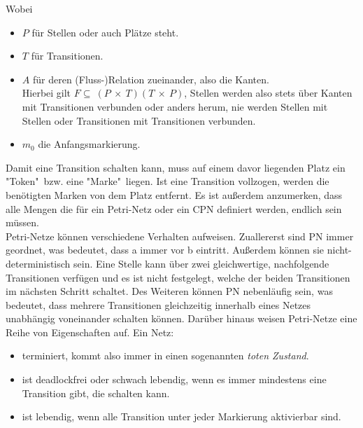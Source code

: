 \documentclass[11pt,onecolumn,a4paper,DIV=calc]{scrartcl}
\begin{document}
Wobei \begin{itemize}
\item $P$ für Stellen oder auch Plätze steht.
\item $T$ für Transitionen.
\item $A$ für deren (Fluss-)Relation zueinander, also die Kanten. \\
Hierbei gilt $F \subseteq\ (P\ \times\ T)(T\ \times\ P)$, Stellen werden also stets über Kanten mit Transitionen verbunden oder anders herum, nie werden Stellen mit Stellen oder Transitionen mit Transitionen verbunden.
\item $m_0$ die Anfangsmarkierung.
\end{itemize}
Damit eine Transition schalten kann, muss auf einem davor liegenden Platz ein "Token"\ bzw. eine "Marke"\ liegen. Ist eine Transition vollzogen, werden die benötigten Marken von dem Platz entfernt. Es ist außerdem anzumerken, dass alle Mengen die für ein Petri-Netz oder ein CPN definiert werden, endlich sein müssen.\\
Petri-Netze können verschiedene Verhalten aufweisen. Zuallererst sind PN immer geordnet, was bedeutet, dass a immer vor b eintritt. Außerdem können sie nicht-deterministisch sein. Eine Stelle kann über zwei gleichwertige, nachfolgende Transitionen verfügen und es ist nicht festgelegt, welche der beiden Transitionen im nächsten Schritt schaltet. Des Weiteren können PN nebenläufig sein, was bedeutet, dass mehrere Transitionen gleichzeitig innerhalb eines Netzes unabhängig voneinander schalten können. 
Darüber hinaus weisen Petri-Netze eine Reihe von Eigenschaften auf. Ein Netz:
\begin{itemize}
\item terminiert, kommt also immer in einen sogenannten \textit{toten Zustand}.
\item ist deadlockfrei oder schwach lebendig, wenn es immer mindestens eine Transition gibt, die schalten kann.
\item ist lebendig, wenn alle Transition unter jeder Markierung aktivierbar sind.
\end{itemize}
\end{document}
